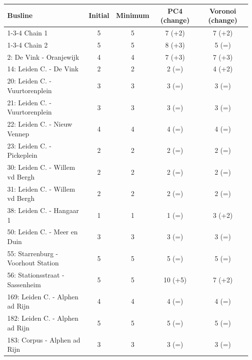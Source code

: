 \begin{table}[h]
    \centering
    \begin{tabular}{l|c|c|c|c}
        Busline                            & Initial & Minimum & PC4 (change) & Voronoi (change) \\
        \hline
        1-3-4 Chain 1                      & 5       & 5       & 7   (+2)     & 7  (+2)          \\
        1-3-4 Chain 2                      & 5       & 5       & 8   (+3)     & 5  (=)           \\
        2: De Vink - Oranjewijk            & 4       & 4       & 7   (+3)     & 7  (+3)          \\
        14: Leiden C. - De Vink            & 2       & 2       & 2   (=)      & 4  (+2)          \\
        20: Leiden C. - Vuurtorenplein     & 3       & 3       & 3   (=)      & 3  (=)           \\
        21: Leiden C. - Vuurtorenplein     & 3       & 3       & 3   (=)      & 3  (=)           \\
        22: Leiden C. - Nieuw Vennep       & 4       & 4       & 4   (=)      & 4  (=)           \\
        23: Leiden C. - Pickeplein         & 2       & 2       & 2   (=)      & 2  (=)           \\
        30: Leiden C. - Willem vd Bergh    & 2       & 2       & 2   (=)      & 2  (=)           \\
        31: Leiden C. - Willem vd Bergh    & 2       & 2       & 2   (=)      & 2  (=)           \\
        38: Leiden C. - Hangaar 1          & 1       & 1       & 1   (=)      & 3  (+2)          \\
        50: Leiden C. - Meer en Duin       & 3       & 3       & 3   (=)      & 3  (=)           \\
        55: Starrenburg - Voorhout Station & 5       & 5       & 5   (=)      & 5  (=)           \\
        56: Stationsstraat - Sassenheim    & 5       & 5       & 10  (+5)     & 7  (+2)          \\
        169: Leiden C. - Alphen ad Rijn    & 4       & 4       & 4   (=)      & 4  (=)           \\
        182: Leiden C. - Alphen ad Rijn    & 5       & 5       & 5   (=)      & 5  (=)           \\
        183: Corpus - Alphen ad Rijn       & 3       & 3       & 3   (=)      & 3  (=)           \\

\end{tabular}
\end{table}
